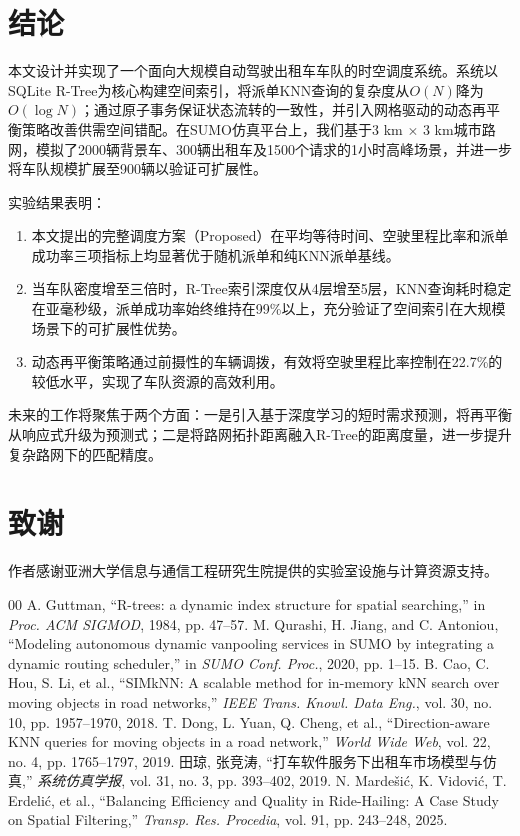 \documentclass[conference]{IEEEtran}
\begin{document}
\section{结论}

本文设计并实现了一个面向大规模自动驾驶出租车车队的时空调度系统。系统以SQLite R-Tree为核心构建空间索引，将派单KNN查询的复杂度从$O(N)$降为$O(\log N)$；通过原子事务保证状态流转的一致性，并引入网格驱动的动态再平衡策略改善供需空间错配。在SUMO仿真平台上，我们基于3 km $\times$ 3 km城市路网，模拟了2000辆背景车、300辆出租车及1500个请求的1小时高峰场景，并进一步将车队规模扩展至900辆以验证可扩展性。

实验结果表明：
\begin{enumerate}
    \item 本文提出的完整调度方案（Proposed）在平均等待时间、空驶里程比率和派单成功率三项指标上均显著优于随机派单和纯KNN派单基线。
    \item 当车队密度增至三倍时，R-Tree索引深度仅从4层增至5层，KNN查询耗时稳定在亚毫秒级，派单成功率始终维持在99\%以上，充分验证了空间索引在大规模场景下的可扩展性优势。
    \item 动态再平衡策略通过前摄性的车辆调拨，有效将空驶里程比率控制在22.7\%的较低水平，实现了车队资源的高效利用。
\end{enumerate}

未来的工作将聚焦于两个方面：一是引入基于深度学习的短时需求预测，将再平衡从响应式升级为预测式；二是将路网拓扑距离融入R-Tree的距离度量，进一步提升复杂路网下的匹配精度。

\section*{致谢}
作者感谢亚洲大学信息与通信工程研究生院提供的实验室设施与计算资源支持。

\begin{thebibliography}{00}
 A. Guttman, ``R-trees: a dynamic index structure for spatial searching,'' in \textit{Proc. ACM SIGMOD}, 1984, pp. 47--57.
 M. Qurashi, H. Jiang, and C. Antoniou, ``Modeling autonomous dynamic vanpooling services in SUMO by integrating a dynamic routing scheduler,'' in \textit{SUMO Conf. Proc.}, 2020, pp. 1--15.
 B. Cao, C. Hou, S. Li, et al., ``SIMkNN: A scalable method for in-memory kNN search over moving objects in road networks,'' \textit{IEEE Trans. Knowl. Data Eng.}, vol. 30, no. 10, pp. 1957--1970, 2018.
 T. Dong, L. Yuan, Q. Cheng, et al., ``Direction-aware KNN queries for moving objects in a road network,'' \textit{World Wide Web}, vol. 22, no. 4, pp. 1765--1797, 2019.
 田琼, 张竞涛, ``打车软件服务下出租车市场模型与仿真,'' \textit{系统仿真学报}, vol. 31, no. 3, pp. 393--402, 2019.
 N. Mardešić, K. Vidović, T. Erdelić, et al., ``Balancing Efficiency and Quality in Ride-Hailing: A Case Study on Spatial Filtering,'' \textit{Transp. Res. Procedia}, vol. 91, pp. 243--248, 2025.
\end{thebibliography}
\end{document}
